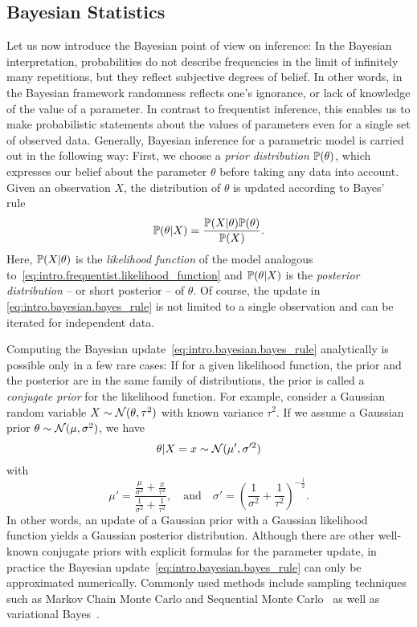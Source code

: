 \subsection{Bayesian Statistics}
\label{sub:intro.bayesian}


Let us now introduce the Bayesian point of view on inference:
In the Bayesian interpretation, probabilities do not describe frequencies in the limit of infinitely many repetitions, but they reflect subjective degrees of belief.
In other words, in the Bayesian framework randomness reflects one's ignorance, or lack of knowledge of the value of a parameter.
In contrast to frequentist inference, this enables us to make probabilistic statements about the values of parameters even for a single set of observed data.
Generally, Bayesian inference for a parametric model is carried out in the following way:
First, we choose a \emph{prior distribution} $\mathbb{P}(\theta)$, which expresses our belief about the parameter $\theta$ before taking any data into account.
Given an observation $X$, the distribution of $\theta$ is updated according to Bayes' rule~\cite{}
\[
  \label{eq:intro.bayesian.bayes_rule}
  \mathbb{P}(\theta | X) = \frac{\mathbb{P}(X | \theta) \mathbb{P}(\theta)}{\mathbb{P}(X)}.
\]
Here, $\mathbb{P}(X|\theta)$ is the \emph{likelihood function} of the model analogous to~\eqref{eq:intro.frequentist.likelihood_function} and $\mathbb{P}(\theta | X)$ is the \emph{posterior distribution} -- or short posterior -- of $\theta$.
Of course, the update in \cref{eq:intro.bayesian.bayes_rule} is not limited to a single observation and can be iterated for independent data.

Computing the Bayesian update~\eqref{eq:intro.bayesian.bayes_rule} analytically is possible only in a few rare cases:
If for a given likelihood function, the prior and the posterior are in the same family of distributions, the prior is called a \emph{conjugate prior} for the likelihood function.
For example, consider a Gaussian random variable $X \sim \mathcal{N}(\theta, \tau^2)$ with known variance $\tau^2$.
If we assume a Gaussian prior $\theta \sim \mathcal{N}(\mu, \sigma^2)$, we have~\cite{}
\[
  \theta \vert X=x \sim \mathcal{N} (\mu', \sigma'^2)
\]
with
\[
  \label{eq:intro.bayesian.kalman}
  \mu' = \frac{ \frac{\mu}{\sigma^2} + \frac{x}{\tau^2} }{ \frac{1}{\sigma^2} + \frac{1}{\tau^2} },
  \quad\mbox{and}\quad
  \sigma' = \left( \frac{1}{\sigma^2} + \frac{1}{\tau^2} \right)^{- \tfrac{1}{2}}.
\]
In other words, an update of a Gaussian prior with a Gaussian likelihood function yields a Gaussian posterior distribution.
Although there are other well-known conjugate priors with explicit formulas for the parameter update, in practice the Bayesian update~\eqref{eq:intro.bayesian.bayes_rule} can only be approximated numerically.
Commonly used methods include sampling techniques such as Markov Chain Monte Carlo and Sequential Monte Carlo~\cite{} as well as variational Bayes~\cite{}.\\


